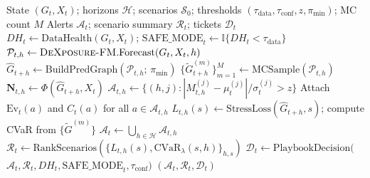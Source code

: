 \begin{algorithm}[!t]
\caption{DeXposure-Agent: one epoch}
\label{alg:agent_loop}
\begin{algorithmic}[1]
\Require State $(G_t,X_t)$; horizons $\mathcal{H}$; scenarios $\mathcal{S}_0$; thresholds $(\tau_{\mathrm{data}},\tau_{\mathrm{conf}},z,\pi_{\min})$; MC count $M$
\Ensure Alerts $\mathcal{A}_t$; scenario summary $\mathcal{R}_t$; tickets $\mathcal{D}_t$
\State $DH_t \gets \mathrm{DataHealth}(G_t,X_t)$;\; $\mathrm{SAFE\_MODE}_t \gets \mathbb{I}\{DH_t<\tau_{\mathrm{data}}\}$
    \State $\mathcal{P}_{t,h} \gets \textsc{DeXposure-FM}.\mathrm{Forecast}(G_t,X_t,h)$
    \State $\widehat{G}_{t+h} \gets \mathrm{BuildPredGraph}(\mathcal{P}_{t,h};\,\pi_{\min})$ 
    \State $\{\widetilde{G}^{(m)}_{t+h}\}_{m=1}^M \gets \mathrm{MCSample}(\mathcal{P}_{t,h})$ 
    \State $\mathbf{N}_{t,h} \gets \Phi(\widehat{G}_{t+h},X_t)$ 
    \State $\mathcal{A}_{t,h} \gets \{(h,j): |M^{(j)}_{t,h}-\mu^{(j)}_t|/\sigma^{(j)}_t > z\}$
    \State Attach $\mathrm{Ev}_t(a)$ and $C_t(a)$ for all $a\in\mathcal{A}_{t,h}$ 
        \State $L_{t,h}(s) \gets \mathrm{StressLoss}(\widehat{G}_{t+h}, s)$;\; compute CVaR from $\{\widetilde{G}^{(m)}\}$
    \EndFor
\EndFor
\State $\mathcal{A}_t \gets \bigcup_{h\in\mathcal{H}}\mathcal{A}_{t,h}$
\State $\mathcal{R}_t \gets \mathrm{RankScenarios}(\{L_{t,h}(s),\mathrm{CVaR}_\lambda(s,h)\}_{h,s})$
\State $\mathcal{D}_t \gets \mathrm{PlaybookDecision}($
\Statex \hspace{\algorithmicindent}$\mathcal{A}_t,\mathcal{R}_t,DH_t,\mathrm{SAFE\_MODE}_t,\tau_{\mathrm{conf}})$ 
\State \Return $(\mathcal{A}_t,\mathcal{R}_t,\mathcal{D}_t)$
\end{algorithmic}
\end{algorithm}
